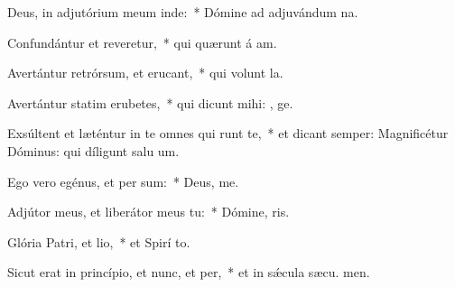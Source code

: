 \item Deus, in adjutórium meum inde:~* Dómine ad adjuvándum  na.
\item Confundántur et reveretur,~* qui quærunt á am.
\item Avertántur retrórsum, et erucant,~* qui volunt  la.
\item Avertántur statim erubetes,~* qui dicunt mihi: , ge.
\item Exsúltent et læténtur in te omnes qui runt te,~* et dicant semper: Magnificétur Dóminus: qui díligunt salu um.
\item Ego vero egénus, et per sum:~* Deus,  me.
\item Adjútor meus, et liberátor meus  tu:~* Dómine,  ris.
\item Glória Patri, et lio,~* et Spirí to.
\item Sicut erat in princípio, et nunc, et per,~* et in sǽcula sæcu. men.
